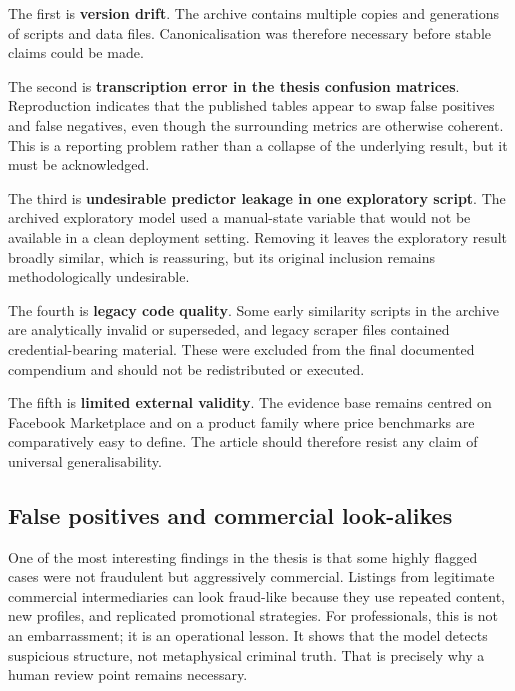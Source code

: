 \documentclass[11pt,a4paper]{article}
\begin{document}
The first is \textbf{version drift}. The archive contains multiple copies and generations of scripts and data files. Canonicalisation was therefore necessary before stable claims could be made.

The second is \textbf{transcription error in the thesis confusion matrices}. Reproduction indicates that the published tables appear to swap false positives and false negatives, even though the surrounding metrics are otherwise coherent. This is a reporting problem rather than a collapse of the underlying result, but it must be acknowledged.

The third is \textbf{undesirable predictor leakage in one exploratory script}. The archived exploratory model used a manual-state variable that would not be available in a clean deployment setting. Removing it leaves the exploratory result broadly similar, which is reassuring, but its original inclusion remains methodologically undesirable.

The fourth is \textbf{legacy code quality}. Some early similarity scripts in the archive are analytically invalid or superseded, and legacy scraper files contained credential-bearing material. These were excluded from the final documented compendium and should not be redistributed or executed.

The fifth is \textbf{limited external validity}. The evidence base remains centred on Facebook Marketplace and on a product family where price benchmarks are comparatively easy to define. The article should therefore resist any claim of universal generalisability.

\subsection{False positives and commercial look-alikes}
One of the most interesting findings in the thesis is that some highly flagged cases were not fraudulent but aggressively commercial. Listings from legitimate commercial intermediaries can look fraud-like because they use repeated content, new profiles, and replicated promotional strategies. For professionals, this is not an embarrassment; it is an operational lesson. It shows that the model detects suspicious structure, not metaphysical criminal truth. That is precisely why a human review point remains necessary.
\end{document}
